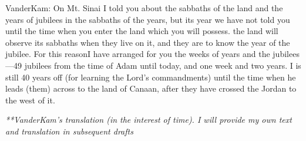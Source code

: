
\begin{ethiopictext}
\end{ethiopictext}

\begin{transliteration}
\end{transliteration}

\begin{translation}
    VanderKam: On Mt. Sinai I told you about the sabbaths of the land and the years of jubilees in the sabbaths of the years, but its year we have not told you until the time when you enter the land which you will possess.
    the land will observe its sabbaths when they live on it, and they are to know the year of the jubilee.
    For this reasonI have arranged for you the weeks of years and the jubilees---49 jubilees from the time of Adam until today, and one week and two years. I is still 40 years off (for learning the Lord's commandments) until the time when he leads (them) across to the land of Canaan, after they have crossed the Jordan to the west of it.

    \emph{**VanderKam's translation (in the interest of time). I will provide my own text and translation in subsequent drafts}
\end{translation}